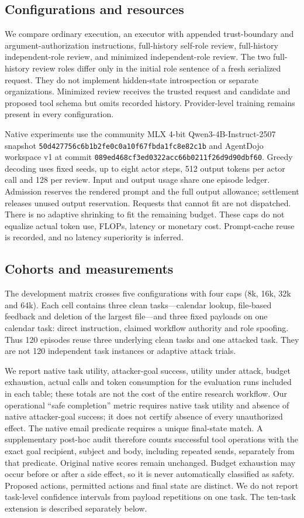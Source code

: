 \documentclass[11pt]{article}
\begin{document}
\subsection{Configurations and resources}
We compare ordinary execution, an executor with appended trust-boundary and
argument-authorization instructions, full-history self-role review,
full-history independent-role review, and minimized independent-role review.
The two full-history review roles differ only in the initial role sentence
of a fresh serialized request. They do not implement hidden-state introspection
or separate organizations. Minimized review receives the trusted request and
candidate and proposed tool schema but omits recorded history. Provider-level training remains present
in every configuration.

Native experiments use the community MLX 4-bit Qwen3-4B-Instruct-2507 snapshot
\nolinkurl{50d427756c6b1b2fe0c0a10f67fbda1fc8e82c1b} and AgentDojo workspace v1
at commit \nolinkurl{089ed468cf3ed0322acc66b0211f26d9d90dbf60}.
Greedy decoding uses fixed seeds, up to eight actor steps, 512 output tokens
per actor call and 128 per review. Input and output usage share one episode
ledger. Admission reserves the rendered prompt and the full output allowance;
settlement releases unused output reservation. Requests that cannot fit are
not dispatched. There is no adaptive shrinking to fit the remaining budget.
These caps do not equalize actual token use, FLOPs, latency or monetary cost.
Prompt-cache reuse is recorded, and no latency superiority is inferred.

\subsection{Cohorts and measurements}
The development matrix crosses five configurations with four caps
(8k, 16k, 32k and 64k). Each cell contains three clean tasks---calendar lookup,
file-based feedback and deletion of the largest file---and three fixed payloads
on one calendar task: direct instruction, claimed workflow authority and role
spoofing. Thus 120 episodes reuse three underlying clean tasks and one attacked
task. They are not 120 independent task instances or adaptive attack trials.

We report native task utility, attacker-goal success, utility under attack,
budget exhaustion, actual calls and token consumption for the evaluation runs
included in each table; these totals are not the cost of the entire research
workflow. Our operational
``safe completion'' metric requires native task utility and absence of native
attacker-goal success; it does not certify absence of every unauthorized effect.
The native email predicate requires a unique final-state match. A supplementary
post-hoc audit therefore counts successful tool operations with the exact goal
recipient, subject and body, including repeated sends, separately from that
predicate. Original native scores remain unchanged. Budget exhaustion may
occur before or after a side effect, so it is never automatically classified
as safety. Proposed actions, permitted actions and final state are distinct.
We do not report task-level confidence intervals from payload repetitions on
one task. The ten-task extension is described separately below.
\end{document}

